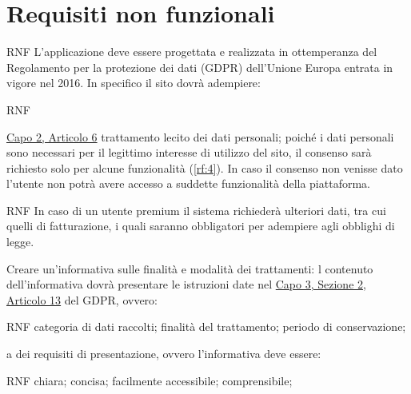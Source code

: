 \section{Requisiti non funzionali}
\label{sec:RequisitiNonFunzionali}

\begin{listaPersonale}{RNF}
     L'applicazione deve essere progettata e realizzata in ottemperanza del Regolamento per la protezione dei dati (GDPR) dell'Unione Europa entrata in vigore nel 2016. In specifico il sito dovrà adempiere:
    \begin{listaPersonale2}{RNF}

         \href{https://eur-lex.europa.eu/legal-content/IT/TXT/?uri=uriserv:OJ.L_.2016.119.01.0001.01.ITA&toc=OJ:L:2016:119:TOC#d1e1898-1-1}{Capo 2, Articolo 6} trattamento lecito dei dati personali; poiché i dati personali sono necessari per il legittimo interesse di utilizzo del sito, il consenso sarà richiesto solo per alcune funzionalità (\ref{rf:4}). In caso il consenso non venisse dato l'utente non potrà avere accesso a suddette funzionalità della piattaforma.
        \begin{listaPersonale3}{RNF}
             In caso di un utente premium il sistema richiederà ulteriori dati, tra cui quelli di fatturazione, i quali saranno obbligatori per adempiere agli obblighi di legge.
        \end{listaPersonale3}

         Creare un'informativa sulle finalità e modalità dei trattamenti: l contenuto dell'informativa dovrà presentare le istruzioni date nel \href{https://eur-lex.europa.eu/legal-content/IT/TXT/?uri=uriserv:OJ.L_.2016.119.01.0001.01.ITA&toc=OJ:L:2016:119:TOC#d1e2261-1-1}{Capo 3, Sezione 2, Articolo 13} del GDPR, ovvero:

        \begin{listaPersonale3}{RNF}
             categoria di dati raccolti;
             finalità del trattamento;
             periodo di conservazione;
        \end{listaPersonale3}

         a dei requisiti di presentazione, ovvero l'informativa deve essere:
        \begin{listaPersonale3}{RNF}
             chiara;
             concisa;
             facilmente accessibile;
             comprensibile;
        \end{listaPersonale3}


\end{listaPersonale2}
\end{listaPersonale}
